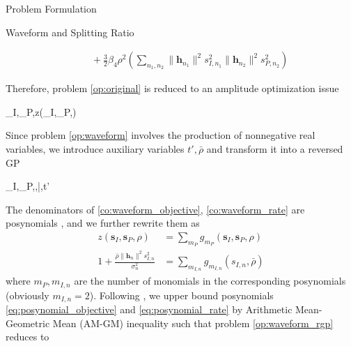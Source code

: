 \documentclass[journal]{IEEEtran}
\begin{document}
\begin{section}{Problem Formulation}
\begin{subsection}{Waveform and Splitting Ratio}
\begin{figure*}[b]
\begin{equation}
\begin{split}
						& \quad + \frac{3}{2}{\beta_4}{\rho^2} \left( \sum_{n_1,n_2} \lVert{\boldsymbol{h}_{n_1}}\rVert^2 s_{I,{n_1}}^2 \lVert{\boldsymbol{h}_{n_2}}\rVert^2 s_{P,{n_2}}^2 \right)
					\end{split}
				\end{equation}
			\end{figure*}
			Therefore, problem \ref{op:original} is reduced to an amplitude optimization issue
			\begin{maxi!}
			{\boldsymbol{s}_I,_P,\rho}{z(\boldsymbol{s}_I,_P,\rho)}{\label{op:waveform}}{}
		\end{maxi!}
			Since problem \ref{op:waveform} involves the production of nonnegative real variables, we introduce auxiliary variables $t',\bar{\rho}$ and transform it into a reversed GP
			\begin{mini!}
			{\boldsymbol{s}_I,_P,\rho,\bar{\rho},t'}{}{\label{op:waveform_rgp}}{}
			\label{co:waveform_power}
			\label{co:waveform_objective}
			\label{co:waveform_rate}
		\end{mini!}
			The denominators of \ref{co:waveform_objective}, \ref{co:waveform_rate} are posynomials \cite{Boyd2007}, and we further rewrite them as
			\begin{align}
				z(\boldsymbol{s}_I,\boldsymbol{s}_P,\rho)&=\sum_{m_P}{g_{m_P}(\boldsymbol{s}_I,\boldsymbol{s}_P,\rho)}\label{eq:posynomial_objective}\\
				1+\frac{\bar{\rho}\lVert{\boldsymbol{h}_n}\rVert^2 s_{I,n}^2}{\sigma_n^2}&=\sum_{m_{I,n}}g_{m_{I,n}}(s_{I,n},\bar{\rho})\label{eq:posynomial_rate}
			\end{align}
			where $m_P,m_{I,n}$ are the number of monomials in the corresponding posynomials (obviously $m_{I,n}=2$). Following \cite{Clerckx2018b,Chiang2005}, we upper bound posynomials \ref{eq:posynomial_objective} and \ref{eq:posynomial_rate} by Arithmetic Mean-Geometric Mean (AM-GM) inequality such that problem \ref{op:waveform_rgp} reduces to
			\begin{mini}

\end{mini}
\end{subsection}
\end{section}
\end{document}
